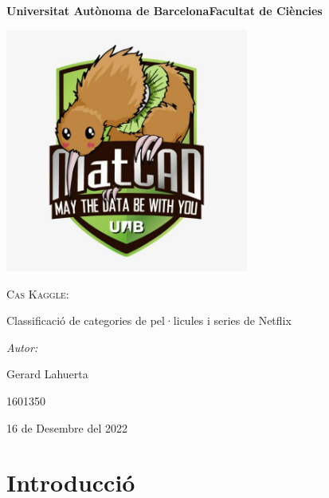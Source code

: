 \documentclass[a4paper, 11pt]{article}
\begin{document}
\begin{titlepage}
    \centering
    {\bfseries\LARGE \hspace{1.9em} Universitat Autònoma de Barcelona\newline Facultat de Ciències\par}
    \vspace{2cm}
    {\hspace{-1em}\includegraphics[width=0.6\textwidth]{MatCAD3.jpg}\par}
    \vspace{1cm}
    {\scshape\Huge Cas Kaggle: \par Classificació de categories de pel·licules i series de Netflix\par} 
    \vspace{1cm}
    {\Large \itshape Autor: \par}
    \vspace{0.5cm}
    {\Large Gerard Lahuerta \par}
    \vspace{0.5cm}
    {\Large 1601350 \par}
    \vspace{1cm}
    {\Large 16 de Desembre del 2022 \par}
\end{titlepage}

\justifying

\newpage
{
\small
\setcounter{page}{2}
\pagestyle{plain}
\tableofcontents
\cleardoublepage
{}
}
\newpage
\section{Introducció}
\end{document}
